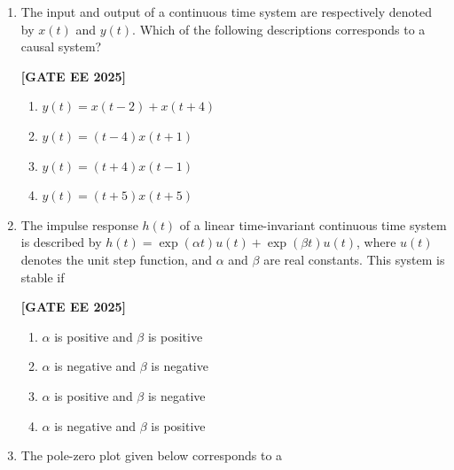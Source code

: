 \documentclass[12pt]{article}
\begin{document}
\begin{enumerate}[leftmargin=2.5em, label=\textbf{Q.\arabic*}., itemsep=2em]
\item The input and output of a continuous time system are respectively denoted by $x(t)$ and $y(t)$. Which of the following descriptions corresponds to a causal system?
 
\noindent \textbf{[GATE EE 2025]}
\begin{multicols}{2}
\begin{enumerate}
    \item $y(t) = x(t-2) + x(t+4)$
    \item $y(t) = (t-4) x(t+1)$
    \item $y(t) = (t+4) x(t-1)$
    \item $y(t) = (t+5) x(t+5)$
\end{enumerate}
\end{multicols}

\item The impulse response $h(t)$ of a linear time-invariant continuous time system is described by $h(t) = \exp(\alpha t) u(t) + \exp(\beta t) u(t)$, where $u(t)$ denotes the unit step function, and $\alpha$ and $\beta$ are real constants. This system is stable if
 
\noindent \textbf{[GATE EE 2025]}
\begin{multicols}{2}
\begin{enumerate}
    \item $\alpha$ is positive and $\beta$ is positive
    \item $\alpha$ is negative and $\beta$ is negative
    \item $\alpha$ is positive and $\beta$ is negative
    \item $\alpha$ is negative and $\beta$ is positive
\end{enumerate}
\end{multicols}

\item The pole-zero plot given below corresponds to a
 

\end{enumerate}
\end{document}

